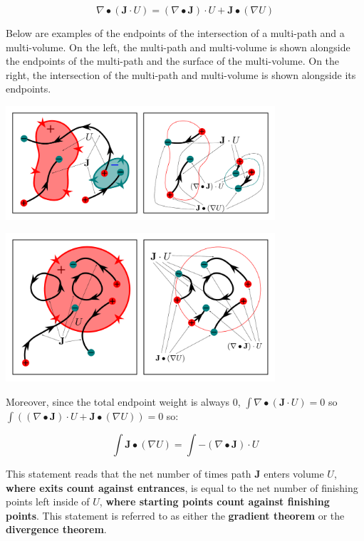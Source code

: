 \begin{thm}
\[\nabla \bullet (\mathbf{J} \cdot U) = (\nabla \bullet \mathbf{J}) \cdot U + \mathbf{J} \bullet (\nabla U)\]
\end{thm}

Below are examples of the endpoints of the intersection of a multi-path and a multi-volume. On the left, the multi-path and multi-volume is shown alongside the endpoints of the multi-path and the surface of the multi-volume. On the right, the intersection of the multi-path and multi-volume is shown alongside its endpoints.

\begin{center}
\includegraphics[width = 0.75\textwidth]{Boundaries/Path_endpoints/path_volume_intersection_endpoints}
\end{center}

\begin{center}
\includegraphics[width = 0.75\textwidth]{Boundaries/Path_endpoints/path_volume_intersection_endpoints_2}
\end{center}

Moreover, since the total endpoint weight is always \(0\), \(\int \nabla \bullet (\mathbf{J} \cdot U) = 0\) so \(\int ((\nabla \bullet \mathbf{J}) \cdot U + \mathbf{J} \bullet (\nabla U)) = 0\) so:

\begin{thm}
\[\int \mathbf{J} \bullet (\nabla U) = \int -(\nabla \bullet \mathbf{J}) \cdot U\]
\end{thm}

This statement reads that the net number of times path \(\mathbf{J}\) enters volume \(U\), {\bf where exits count against entrances}, is equal to the net number of finishing points left inside of \(U\), {\bf where starting points count against finishing points}. This statement is referred to as either the {\bf gradient theorem} or the {\bf divergence theorem}.

